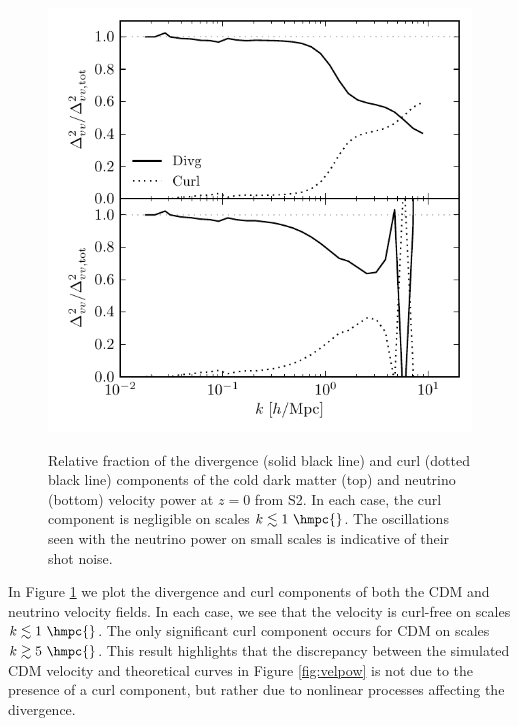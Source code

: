 \begin{figure}[!t]
\begin{center}
\includegraphics[width=\smwidth]{./figures/neutrinos/fig7.pdf} \vspace{-0.1cm}
\caption[Divergence and curl components of the cold dark matter and neutrino velocity power]
{Relative fraction of the divergence (solid black
line) and curl (dotted black line) components of the cold dark
matter (top) and neutrino (bottom) velocity power at $z = 0$
from S2. In each case, the curl component is negligible on
scales $k \lesssim 1\ \hmpc{}$.  The oscillations seen with
the neutrino power on small scales is indicative of their
shot noise.}
\vspace{-0.2cm}
\label{fig:veldiv}
\end{center}
\end{figure}
 
In Figure \ref{fig:veldiv} we plot the divergence and curl components of both the CDM and neutrino velocity fields. In each case, we see that the velocity is curl-free on scales $k \lesssim 1\ \hmpc{}$.  The only significant curl component occurs for CDM on scales $k \gtrsim 5\ \hmpc{}$.  This result highlights that the discrepancy between the simulated CDM velocity and theoretical curves in Figure \ref{fig:velpow} is not due to the presence of a curl component, but rather due to nonlinear processes affecting the divergence.

